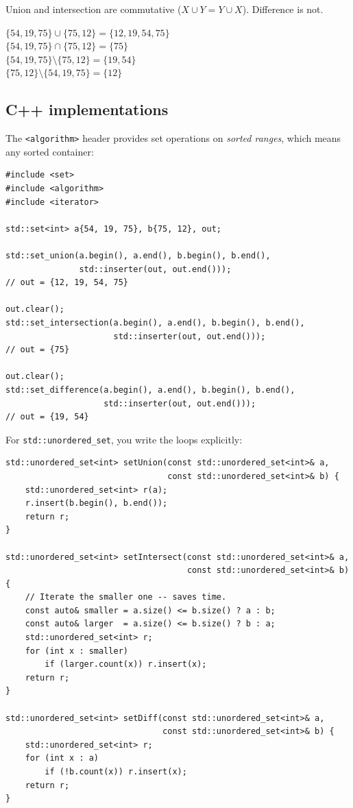 \documentclass[11pt]{article}
\begin{document}
Union and intersection are commutative ($X \cup Y = Y \cup X$). Difference is not.

\begin{examplebox}
$\{54, 19, 75\} \cup \{75, 12\} = \{12, 19, 54, 75\}$ \\
$\{54, 19, 75\} \cap \{75, 12\} = \{75\}$ \\
$\{54, 19, 75\} \setminus \{75, 12\} = \{19, 54\}$ \\
$\{75, 12\} \setminus \{54, 19, 75\} = \{12\}$
\end{examplebox}

\subsection*{C++ implementations}

The \texttt{<algorithm>} header provides set operations on \emph{sorted ranges}, which means any sorted container:

\begin{lstlisting}[basicstyle=\ttfamily\small,frame=single]
#include <set>
#include <algorithm>
#include <iterator>

std::set<int> a{54, 19, 75}, b{75, 12}, out;

std::set_union(a.begin(), a.end(), b.begin(), b.end(),
               std::inserter(out, out.end()));
// out = {12, 19, 54, 75}

out.clear();
std::set_intersection(a.begin(), a.end(), b.begin(), b.end(),
                      std::inserter(out, out.end()));
// out = {75}

out.clear();
std::set_difference(a.begin(), a.end(), b.begin(), b.end(),
                    std::inserter(out, out.end()));
// out = {19, 54}
\end{lstlisting}

For \texttt{std::unordered\_set}, you write the loops explicitly:

\begin{lstlisting}[basicstyle=\ttfamily\small,frame=single]
std::unordered_set<int> setUnion(const std::unordered_set<int>& a,
                                 const std::unordered_set<int>& b) {
    std::unordered_set<int> r(a);
    r.insert(b.begin(), b.end());
    return r;
}

std::unordered_set<int> setIntersect(const std::unordered_set<int>& a,
                                     const std::unordered_set<int>& b) {
    // Iterate the smaller one -- saves time.
    const auto& smaller = a.size() <= b.size() ? a : b;
    const auto& larger  = a.size() <= b.size() ? b : a;
    std::unordered_set<int> r;
    for (int x : smaller)
        if (larger.count(x)) r.insert(x);
    return r;
}

std::unordered_set<int> setDiff(const std::unordered_set<int>& a,
                                const std::unordered_set<int>& b) {
    std::unordered_set<int> r;
    for (int x : a)
        if (!b.count(x)) r.insert(x);
    return r;
}
\end{lstlisting}
\end{document}
